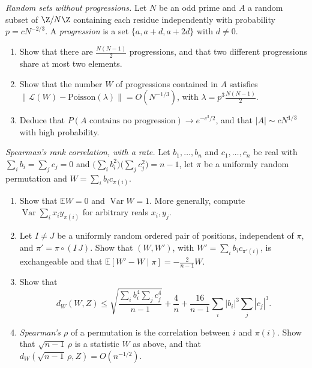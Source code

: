 \begin{exercise}[$\star\star$]\label{pb:threeap}
\emph{Random sets without progressions.} Let $N$ be an odd prime and $A$ a random subset of $\Z/N\Z$ containing each residue independently with probability
$p=cN^{-2/3}$. A \emph{progression} is a set $\{a,a+d,a+2d\}$ with $d\ne0$.
\begin{enumerate}[label=(\alph*)]
\item Show that there are $\frac{N(N-1)}2$ progressions, and that two different progressions share at most two elements.
\item Show that the number $W$ of progressions contained in $A$ satisfies $\|\mathcal L(W)-\text{Poisson}(\lambda)\|=O(N^{-1/3})$, with $\lambda=p^3\frac{N(N-1)}2$.
\item Deduce that $P(A\text{ contains no progression})\to e^{-c^3/2}$, and that $|A|\sim cN^{1/3}$ with high probability.
\end{enumerate}
\end{exercise}

\begin{exercise}[$\star\star\star$]\label{pb:spearman}
\emph{Spearman's rank correlation, with a rate.} Let $b_1,\dots,b_n$ and $c_1,\dots,c_n$ be real with $\sum_ib_i=\sum_jc_j=0$ and $\bigl(\sum_ib_i^2\bigr)\bigl(\sum_jc_j^2\bigr)=n-1$,
let $\pi$ be a uniformly random permutation and $W=\sum_ib_ic_{\pi(i)}$.
\begin{enumerate}[label=(\alph*)]
\item Show that $\mathbb EW=0$ and $\operatorname{Var}W=1$. More generally, compute $\operatorname{Var}\sum_ix_iy_{\pi(i)}$ for arbitrary reals $x_i,y_j$.
\item Let $I\ne J$ be a uniformly random ordered pair of positions, independent of $\pi$, and $\pi'=\pi\circ(I\,J)$. Show that $(W,W')$, with
$W'=\sum_ib_ic_{\pi'(i)}$, is exchangeable and that $\mathbb E[W'-W\mid\pi]=-\frac2{n-1}W$.
\item Show that
\[
d_W(W,Z)\le\sqrt{\frac{\sum_ib_i^4\sum_jc_j^4}{n-1}}+\frac4n+\frac{16}{n-1}\sum_i|b_i|^3\sum_j|c_j|^3.
\]
\item \emph{Spearman's $\rho$} of a permutation is the correlation between $i$ and $\pi(i)$. Show that $\sqrt{n-1}\,\rho$ is a statistic $W$ as above, and that
$d_W(\sqrt{n-1}\,\rho,Z)=O(n^{-1/2})$.
\end{enumerate}
\end{exercise}

